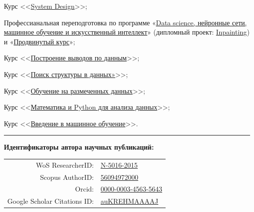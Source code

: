 \documentclass[11pt]{article}
\renewenvironment{itemize}{
	\begin{list}{\labelitemi}{
			\setlength{\topsep   }{0pt}
			\setlength{\partopsep}{0pt}
			\setlength{\parskip  }{0pt}
			\setlength{\parsep   }{0pt}
			\setlength{\itemsep  }{0pt}
		}
	}{\end{list}}
\begin{document}
	\begin{itemize}
		\item Курс <<\href{https://lab.karpov.courses/certificate/752f8aad-7f6e-40ad-98c2-12efe12bc0b7/}{System Design}>>;
		\item Профессианальная переподготовка по программе «\href{https://disk.yandex.ru/i/H5-s3Lw6j-1wkg}{Data science, нейронные сети, машинное обучение и искусственный интеллект}» (дипломный проект: \href{https://github.com/NikitaShubin/Inpainting}{Inpainting}) и «\href{https://disk.yandex.ru/i/t3yNB56C3nNo5A}{Продвинутый курс}»;
		\item Курс <<\href{https://www.coursera.org/account/accomplishments/certificate/DMUZAUCWBQG4}{Построение выводов по данным}>>;
		\item Курс <<\href{https://www.coursera.org/account/accomplishments/certificate/H8BWKAK4Y96D}{Поиск структуры в данных»}>>;
		\item Курс <<\href{https://www.coursera.org/account/accomplishments/certificate/9GQC5C4UP9YB}{Обучение на размеченных данных}>>;
		\item Курс <<\href{https://www.coursera.org/account/accomplishments/certificate/2AZHZW96L%J2N}{Математика и Python для анализа данных}>>;
		\item Курс <<\href{https://www.coursera.org/account/accomplishments/certificate/6K5Z2UFA5887}{Введение в машинное обучение}>>.
	\end{itemize}
	\vspace{1em}
	\hrule
	\vspace{1em}
	\noindent\hypertarget{AutorIDs}{\textbf{Идентификаторы автора научных публикаций:}}
	\vspace*{-\baselineskip} %
	\vspace{0.5em}
	\begin{longtable} {r | l}
		WoS ResearcherID: & \href{https://publons.com/researcher/2345963/nikita-y-shubin/}{\underline{N-5016-2015}}\\
		Scopus AuthorID: & \href{https://www.scopus.com/authid/detail.uri?authorId=56094972000}{\underline{56094972000}}\\
		Orcid: & \href{https://orcid.org/0000-0003-4563-5643}{\underline{0000-0003-4563-5643}}\\
		Google Scholar Citations ID: & \href{https://scholar.google.com/citations?user=auKREHMAAAAJ}{\underline{auKREHMAAAAJ}}
	\end{longtable}
	
\end{document}
